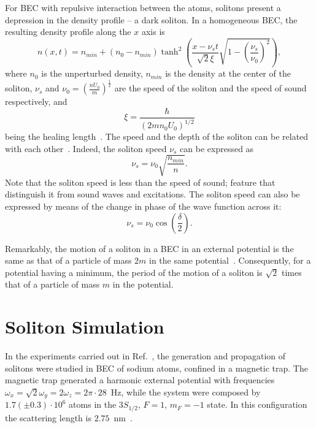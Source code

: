 For BEC with repulsive interaction between the atoms, solitons present a depression in the density profile -- a dark soliton. In a homogeneous BEC, the resulting density profile along the $x$ axis is
\begin{equation}
n(x,t) = n_{min} + \left(n_0 - n_{min}\right)\tanh^2 \left( \frac{x - \nu_s t}{\sqrt{2} \xi} \sqrt{1 - \left( \frac{\nu_s}{\nu_0} \right)^2 } \right),
\end{equation}
where $n_0$ is the unperturbed density, $n_{min}$ is the density at the center of the soliton, $\nu_s$ and  $\nu_0 = (\frac{nU_0}{m})^{\frac{1}{2}}$ are the speed of the soliton and the speed of sound respectively, and 
\begin{equation}
\xi = \frac{\hbar}{\left( 2mn_0 U_0 \right)^{1/2}}
\end{equation}
being the healing length~\citep{pethick2002bose}. The speed and the depth of the soliton can be related with each other~\citep{RC97,JKP98}. Indeed, the soliton speed $\nu_s$ can be expressed as
\begin{equation} \label{eq:soliton-speed-density}
\nu_s = \nu_0 \sqrt{ \frac{n_{min}}{n} }.
\end{equation}
Note that the soliton speed is less than the speed of sound; feature that distinguish it from sound waves and excitations. The soliton speed can also be expressed by means of the change in phase of the wave function across it:
\begin{equation}
\nu_s = \nu_0 \cos \left( \frac{\delta}{2} \right).
\end{equation}

Remarkably, the motion of a soliton in a BEC in an external potential is the same as that of a particle of mass $2m$ in the same potential~\citep{pethick2002bose}. Consequently, for a potential having a minimum, the period of the motion of a soliton is $\sqrt{2}$ times that of a particle of mass $m$ in the potential.

\section{Soliton Simulation}
In the experiments carried out in Ref.~\citep{DSF00}, the generation and propagation of solitons were studied in BEC of sodium atoms, confined in a magnetic trap. The magnetic trap generated a harmonic external potential with frequencies $\omega_x = \sqrt{2}\omega_y = 2 \omega_z = 2 \pi \cdot 28$~Hz, while the system were composed by  $1.7 (\pm 0.3) \cdot 10^6$ atoms in the $3S_{1/2}$, $F=1$, $m_F=-1$ state. In this configuration the scattering length is $2.75$~nm~\citep{DSF00}. 

